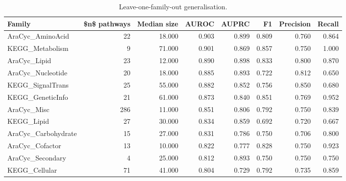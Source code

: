 \begin{table}[htbp]
\centering
\caption{Leave-one-family-out generalisation.}
\label{tab:lofo_recomputed}
\begin{tabular}{lrrrrrrr}
\toprule
Family & \$n\$ pathways & Median size & AUROC & AUPRC & F1 & Precision & Recall \\
\midrule
AraCyc\_AminoAcid & 22 & 18.000 & 0.903 & 0.899 & 0.809 & 0.760 & 0.864 \\
KEGG\_Metabolism & 9 & 71.000 & 0.901 & 0.869 & 0.857 & 0.750 & 1.000 \\
AraCyc\_Lipid & 23 & 12.000 & 0.890 & 0.898 & 0.833 & 0.800 & 0.870 \\
AraCyc\_Nucleotide & 20 & 18.000 & 0.885 & 0.893 & 0.722 & 0.812 & 0.650 \\
KEGG\_SignalTrans & 25 & 55.000 & 0.882 & 0.852 & 0.756 & 0.850 & 0.680 \\
KEGG\_GeneticInfo & 21 & 61.000 & 0.873 & 0.840 & 0.851 & 0.769 & 0.952 \\
AraCyc\_Misc & 286 & 11.000 & 0.851 & 0.806 & 0.792 & 0.750 & 0.839 \\
KEGG\_Lipid & 27 & 30.000 & 0.834 & 0.859 & 0.692 & 0.720 & 0.667 \\
AraCyc\_Carbohydrate & 15 & 27.000 & 0.831 & 0.786 & 0.750 & 0.706 & 0.800 \\
AraCyc\_Cofactor & 13 & 10.000 & 0.822 & 0.777 & 0.828 & 0.750 & 0.923 \\
AraCyc\_Secondary & 4 & 25.000 & 0.812 & 0.893 & 0.750 & 0.750 & 0.750 \\
KEGG\_Cellular & 71 & 41.000 & 0.804 & 0.729 & 0.792 & 0.735 & 0.859 \\
\bottomrule
\end{tabular}

\end{table}
